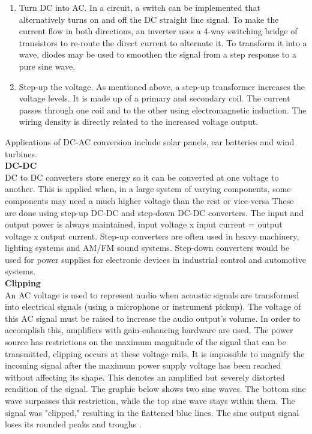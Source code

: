\documentclass[12pt,a4paper]{article}
\begin{document}
			\begin{enumerate}
				\item Turn DC into AC. In a circuit, a switch can be implemented that alternatively turns on and off the DC straight line signal. To make the current flow in both directions, an inverter uses a 4-way switching bridge of transistors to re-route the direct current to alternate it. To transform it into a wave, diodes may be used to smoothen the signal from a step response to a pure sine wave.
				\item Step-up the voltage. As mentioned above, a step-up transformer increases the voltage levels. It is made up of a primary and secondary coil. The current passes through one coil and to the other using electromagnetic induction. The wiring density is directly related to the increased voltage output.
			\end{enumerate}
			Applications of DC-AC conversion include solar panels, car batteries and wind turbines.
			\\\textbf{DC-DC}\\
			DC to DC converters store energy so it can be converted at one voltage to another. This is applied when, in a large system of varying components, some components may need a much higher voltage than the rest or vice-versa \cite{DCDC}
			These are done using step-up DC-DC and step-down DC-DC converters. The input and output power is always maintained, input voltage x input current = output voltage x output current. Step-up converters are often used in heavy machinery, lighting systems and AM/FM sound systems. Step-down converters would be used for power supplies for electronic devices in industrial control and automotive systems.
			\\\textbf{Clipping}\\
			An AC voltage is used to represent audio when acoustic signals are transformed into electrical signals (using a microphone or instrument pickup). The voltage of this AC signal must be raised to increase the audio output's volume. In order to accomplish this, amplifiers with gain-enhancing hardware are used. The power source has restrictions on the maximum magnitude of the signal that can be transmitted, clipping occurs at these voltage rails. It is impossible to magnify the incoming signal after the maximum power supply voltage has been reached without affecting its shape. This denotes an amplified but severely distorted rendition of the signal. The graphic below shows two sine waves. The bottom sine wave surpasses this restriction, while the top sine wave stays within them. The signal was "clipped," resulting in the flattened blue lines. The sine output signal loses its rounded peaks and troughs \cite{CLIPPING}.
\end{document}
